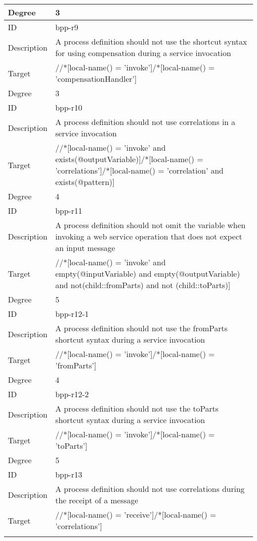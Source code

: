 \begin{center}
\begin{tiny}
\begin{longtable}{p{}|p{}}
\myrowcolour
Degree & 3\\
\midrule
ID & bpp-r9\\
\myrowcolour
Description &A process definition should not use the shortcut syntax for using compensation during a service invocation\\
Target & //*[local-name() = 'invoke']/*[local-name() = 'compensationHandler']\\
\myrowcolour
Degree & 3\\
\midrule
ID & bpp-r10\\
\myrowcolour
Description &A process definition should not use correlations in a service invocation\\
Target & //*[local-name() = 'invoke' and exists(@outputVariable)]/*[local-name() = 'correlations']/*[local-name() = 'correlation' and exists(@pattern)]\\
\myrowcolour
Degree & 4\\
\midrule
ID & bpp-r11\\
\myrowcolour
Description &A process definition should not omit the variable when invoking a web service operation that does not expect an input message\\
Target & //*[local-name() = 'invoke' and empty(@inputVariable) and empty(@outputVariable) and not(child::fromParts) and not (child::toParts)]\\
\myrowcolour
Degree & 5\\
\midrule
ID & bpp-r12-1\\
\myrowcolour
Description &A process definition should not use the fromParts shortcut syntax during a service invocation\\
Target & //*[local-name() = 'invoke']/*[local-name() = 'fromParts']\\
\myrowcolour
Degree & 4\\
\midrule
ID & bpp-r12-2\\
\myrowcolour
Description &A process definition should not use the toParts shortcut syntax during a service invocation\\
Target & //*[local-name() = 'invoke']/*[local-name() = 'toParts']\\
\myrowcolour
Degree & 5\\
\midrule
ID & bpp-r13\\
\myrowcolour
Description &A process definition should not use correlations during the receipt of a message\\
Target & //*[local-name() = 'receive']/*[local-name() = 'correlations']\\
\myrowcolour

\end{longtable}
\end{tiny}
\end{center}
